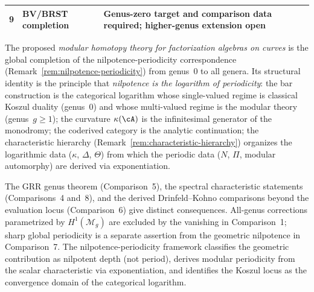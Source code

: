 \begin{remark}
\begin{center}
\begin{tabular}{@{}clp{5.5cm}@{}}
9 & BV/BRST completion & Genus-zero target and comparison data required; higher-genus extension open \\
\bottomrule
\end{tabular}
\end{center}
\noindent
The proposed \emph{modular homotopy theory for
factorization algebras on curves} is the global completion of the
nilpotence-periodicity correspondence
(Remark~\ref{rem:nilpotence-periodicity}) from genus~$0$ to all
genera.  Its structural identity is the principle that
\emph{nilpotence is the logarithm of periodicity}: the bar
construction is the categorical logarithm whose single-valued
regime is classical Koszul duality (genus~$0$) and whose
multi-valued regime is the modular theory (genus~$g \geq 1$); the
curvature $\kappa(\cA)$ is the infinitesimal generator of the
monodromy; the coderived category is the analytic continuation; the
characteristic hierarchy
(Remark~\ref{rem:characteristic-hierarchy}) organizes the
logarithmic data ($\kappa$, $\Delta$, $\Theta$) from which the
periodic data ($N$, $\Pi$, modular automorphy) are derived via
exponentiation.

The GRR genus theorem (Comparison~5), the spectral characteristic statements
(Comparisons~4 and~8), and the derived Drinfeld--Kohno comparisons beyond the evaluation locus
(Comparison~6) give distinct consequences.  All-genus corrections parametrized by
$H^1(\mathcal M_g)$ are excluded by the vanishing in Comparison~1;
sharp global periodicity is a separate assertion from the geometric nilpotence in Comparison~7.
The nilpotence-periodicity framework
classifies the geometric contribution as nilpotent depth (not
period), derives modular periodicity from the scalar
characteristic via exponentiation, and identifies the Koszul locus
as the convergence domain of the categorical logarithm.
\end{remark}


